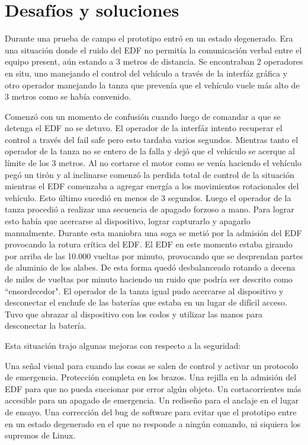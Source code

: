 \section{Desafíos y soluciones}\label{sec:challenges-solutions}

Durante una prueba de campo el prototipo entró en un estado degenerado. 
Era una situación donde el ruido del EDF no permitía la comunicación verbal entre
el equipo present, aún estando a 3 metros de distancia. 
Se encontraban 2 operadores en situ, uno manejando el control del vehículo a través
de la interfáz gráfica y otro operador manejando la tanza que prevenía que el vehículo vuele más alto de 3 metros como se había convenido.

Comenzó con un momento de confusión cuando luego de comandar a que se detenga el EDF no se detuvo. El operador de la interfáz intento recuperar el control a través del fail safe pero esto tardaba varios segundos. Mientras tanto el operador de la tanza no se entero de la falla y dejó que el vehículo se acerque al límite de los 3 metros. Al no cortarse el motor como se venía haciendo el vehículo pegó un tirón y al inclinarse comenzó la perdida total de control de la situación mientras el EDF comenzaba a agregar energía a los movimientos rotacionales del vehículo. Esto último sucedió en menos de 3 segundos. Luego el operador de la tanza procedió a realizar una secuencia de apagado forzoso a mano. Para lograr esto había que acercarse al dispositivo, lograr capturarlo y apagarlo manualmente.
Durante esta maniobra una soga se metió por la admisión del EDF provocando la rotura crítica del EDF. El EDF en este momento estaba girando por arriba de las 10.000 vueltas por minuto, provocando que se desprendan partes de aluminio de los alabes. De esta forma quedó desbalanceado rotando a decena de miles de vueltas por minuto haciendo un ruido que podría ser descrito como ``ensordecedor". El operador de la tanza igual pudo acercarse al dispositivo y desconectar el enchufe de las baterías que estaba en un lugar de difícil acceso. Tuvo que abrazar al dispositivo con los codos y utilizar las manos para desconectar la batería.

Esta situación trajo algunas mejoras con respecto a la seguridad:

Una señal visual para cuando las cosas se salen de control y activar un protocolo de emergencia.
Protección completa en los brazos.
Una rejilla en la admisión del EDF para que no pueda succionar por error algún objeto.
Un cortacorrientes más accesible para un apagado de emergencia.
Un rediseño para el anclaje en el lugar de ensayo.
Una corrección del bug de software para evitar que el prototipo entre en un estado degenerado en el que no responde a ningún comando, ni siquiera los supremos de Linux.


